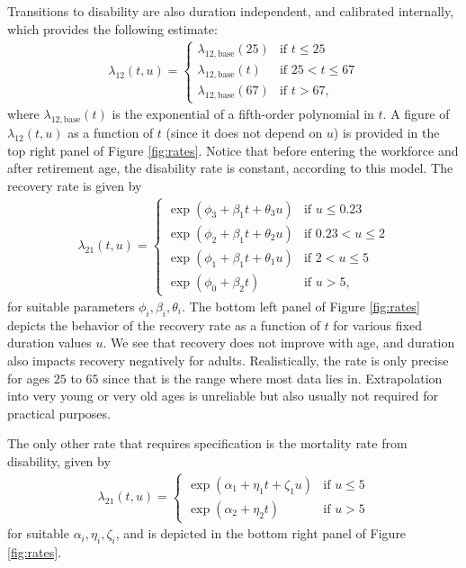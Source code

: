 \documentclass[11pt,leqno]{amsart}
\numberwithin{table}{section}
\numberwithin{figure}{section}
\numberwithin{equation}{section}
\newcommand{\1}{{\mathds{1}}}
\newcommand{\0}{\mat{0}}
\begin{document}
{Transitions to disability are also duration independent, and calibrated internally, which provides the following estimate:
\begin{align*}
\lambda_{12}(t,u)= \begin{cases}
  \lambda_{12,\text{base}}(25) & \text{if } t \leq 25 \\
  \lambda_{12,\text{base}}(t) & \text{if } 25 < t \leq 67 \\
  \lambda_{12,\text{base}}(67) & \text{if } t > 67,
\end{cases}
\end{align*}
where $ \lambda_{12,\text{base}}(t)$ is the exponential of a fifth-order polynomial in $t$. A figure of $\lambda_{12}(t,u)$ as a function of $t$ (since it does not depend on $u$) is provided in the top right panel of Figure \ref{fig:rates}. Notice that before entering the workforce and after retirement age, the disability rate is constant, according to this model. The recovery rate is given by
\begin{align*}
\lambda_{21}(t,u)=
\begin{cases}
  \exp(\phi_3 + \beta_1 t + \theta_3 u) & \text{if } u \leq 0.23 \\
  \exp(\phi_2 + \beta_1 t + \theta_2 u) & \text{if } 0.23 < u \leq 2 \\
  \exp(\phi_1 + \beta_1 t + \theta_1 u) & \text{if } 2 < u \leq 5 \\
  \exp(\phi_0 + \beta_2 t) & \text{if } u > 5,
\end{cases}
\end{align*}
for suitable parameters $\phi_i,\beta_i,\theta_i$. The bottom left panel of Figure \ref{fig:rates} depicts the behavior of the recovery rate as a function of $t$ for various fixed duration values $u$. We see that recovery does not improve with age, and duration also impacts recovery negatively for adults. Realistically, the rate is only precise for ages $25$ to $65$ since that is the range where most data lies in. Extrapolation into very young or very old ages is unreliable but also usually not required for practical purposes.

The only other rate that requires specification is  {the} mortality rate from disability, given by
\begin{align*}
\lambda_{21}(t,u)=
\begin{cases}
  \exp(\alpha_{1} + \eta_{1} t + \zeta_{1} u) & \text{if } u \leq 5 \\
  \exp(\alpha_{2} + \eta_{2} t) & \text{if } u > 5
\end{cases}
\end{align*}
for suitable $\alpha_i,\eta_i,\zeta_i$, and is depicted in the bottom right panel of Figure \ref{fig:rates}.

}
\end{document}

